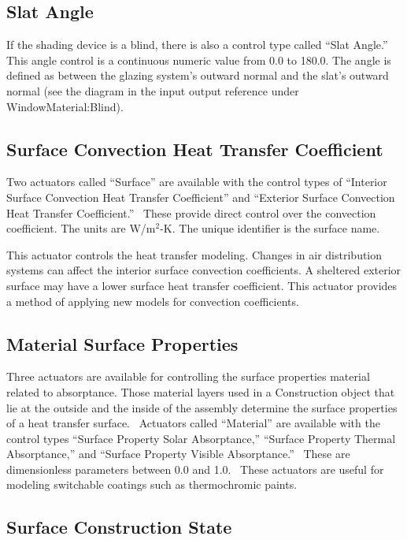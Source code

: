 \subsection{Slat Angle}\label{slat-angle}

If the shading device is a blind, there is also a control type called ``Slat Angle.''~ This angle control is a continuous numeric value from 0.0 to 180.0. The angle is defined as between the glazing system's outward normal and the slat's outward normal (see the diagram in the input output reference under WindowMaterial:Blind).

\subsection{Surface Convection Heat Transfer Coefficient}\label{surface-convection-heat-transfer-coefficient}

Two actuators called ``Surface'' are available with the control types of ``Interior Surface Convection Heat Transfer Coefficient'' and ``Exterior Surface Convection Heat Transfer Coefficient.''~ These provide direct control over the convection coefficient. The units are W/m\(^{2}\)-K. The unique identifier is the surface name.

This actuator controls the heat transfer modeling. Changes in air distribution systems can affect the interior surface convection coefficients. A sheltered exterior surface may have a lower surface heat transfer coefficient. This actuator provides a method of applying new models for convection coefficients.

\subsection{Material Surface Properties}\label{material-surface-properties}

Three actuators are available for controlling the surface properties material related to absorptance. Those material layers used in a Construction object that lie at the outside and the inside of the assembly determine the surface properties of a heat transfer surface.~ Actuators called ``Material'' are available with the control types ``Surface Property Solar Absorptance,'' ``Surface Property Thermal Absorptance,'' and ``Surface Property Visible Absorptance.''~ These are dimensionless parameters between 0.0 and 1.0.~ These actuators are useful for modeling switchable coatings such as thermochromic paints.

\subsection{Surface Construction State}\label{surface-construction-state}

